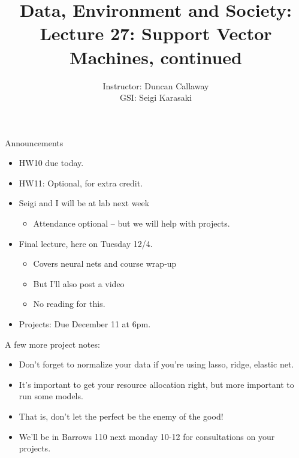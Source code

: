 \documentclass[mathserif, aspectratio=169]{beamer}
\title[Lecture 23] %
{Data, Environment and Society: \\{Lecture 27: Support Vector Machines, continued}}
\author[ER190C: Data, Environment and Society] 
{Instructor: Duncan Callaway\\
GSI: Seigi Karasaki}
\institute[UC Berkeley] %
 {\small{ \bf November 27, 2018}}
\date[November 27, 2018]
\begin{document}
\frame{
	\titlepage
}

\begin{frame}{Announcements}
	\begin{itemize}
		\item HW10 due today.
		\item HW11: Optional, for extra credit.  
		\item Seigi and I will be at lab next week
		\begin{itemize}
			\item Attendance optional -- but we will help with projects.
		\end{itemize}
		\item Final lecture, here on Tuesday 12/4.  
		\begin{itemize}
			\item Covers neural nets and course wrap-up
			\item But I'll also post a video 
			\item No reading for this.
		\end{itemize}
		\item Projects: Due December 11 at 6pm.
	\end{itemize}
\end{frame}

\begin{frame}{	A few more project notes:}
	\begin{itemize}
		\item Don't forget to normalize your data if you're using lasso, ridge, elastic net. 
		\item It's important to get your resource allocation right, but more important to run some models.
		\item That is, don't let the perfect be the enemy of the good!
		\item We'll be in Barrows 110 next monday 10-12 for consultations on your projects.
	\end{itemize}	
\end{frame}
\end{document}
